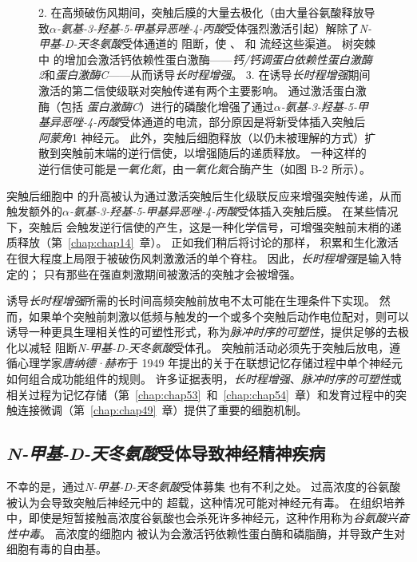 \begin{figure}[htbp]
{		2. 在高频破伤风期间，突触后膜的大量去极化（由大量谷氨酸释放导致\textit{$\alpha$-氨基-3-羟基-5-甲基异恶唑-4-丙酸}受体强烈激活引起）解除了\textit{N-甲基-D-天冬氨酸}受体通道的  阻断，使 、 和  流经这些渠道。
		树突棘中  的增加会激活钙依赖性蛋白激酶——\textit{钙/钙调蛋白依赖性蛋白激酶 2}和\textit{蛋白激酶C}——从而诱导\textit{长时程增强}。
		3. 在诱导\textit{长时程增强}期间激活的第二信使级联对突触传递有两个主要影响。
		通过激活蛋白激酶（包括 \textit{蛋白激酶C}）进行的磷酸化增强了通过\textit{$\alpha$-氨基-3-羟基-5-甲基异恶唑-4-丙酸}受体通道的电流，部分原因是将新受体插入突触后 \textit{阿蒙角}1 神经元。
		此外，突触后细胞释放（以仍未被理解的方式）扩散到突触前末端的逆行信使，以增强随后的递质释放。
		一种这样的逆行信使可能是\textit{一氧化氮}，由\textit{一氧化氮}合酶产生（如图 B-2 所示）。}
	\label{fig:13_10}
\end{figure}


突触后细胞中  的升高被认为通过激活突触后生化级联反应来增强突触传递，从而触发额外的\textit{$\alpha$-氨基-3-羟基-5-甲基异恶唑-4-丙酸}受体插入突触后膜。
在某些情况下，突触后  会触发逆行信使的产生，这是一种化学信号，可增强突触前末梢的递质释放（第~\ref{chap:chap14}~章）。
正如我们稍后将讨论的那样， 积累和生化激活在很大程度上局限于被破伤风刺激激活的单个脊柱。
因此，\textit{长时程增强}是输入特定的；
只有那些在强直刺激期间被激活的突触才会被增强。


诱导\textit{长时程增强}所需的长时间高频突触前放电不太可能在生理条件下实现。
然而，如果单个突触前刺激以低频与触发的一个或多个突触后动作电位配对，则可以诱导一种更具生理相关性的可塑性形式，称为\textit{脉冲时序的可塑性}，提供足够的去极化以减轻  阻断\textit{N-甲基-D-天冬氨酸}受体孔。
突触前活动必须先于突触后放电，遵循心理学家\textit{唐纳德·赫布}于 1949 年提出的关于在联想记忆存储过程中单个神经元如何组合成功能组件的规则。
许多证据表明，\textit{长时程增强}、\textit{脉冲时序的可塑性}或相关过程为记忆存储（第~\ref{chap:chap53}~和~\ref{chap:chap54}~章）和发育过程中的突触连接微调（第~\ref{chap:chap49}~章）提供了重要的细胞机制。



\subsection{\textit{N-甲基-D-天冬氨酸}受体导致神经精神疾病}

不幸的是，通过\textit{N-甲基-D-天冬氨酸}受体募集  也有不利之处。
过高浓度的谷氨酸被认为会导致突触后神经元中的  超载，这种情况可能对神经元有毒。
在组织培养中，即使是短暂接触高浓度谷氨酸也会杀死许多神经元，这种作用称为\textit{谷氨酸兴奋性中毒}。
高浓度的细胞内  被认为会激活钙依赖性蛋白酶和磷脂酶，并导致产生对细胞有毒的自由基。


